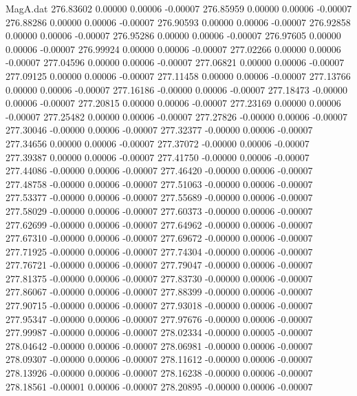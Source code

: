\begin{filecontents}{MagA.dat}
 276.83602    0.00000    0.00006   -0.00007
 276.85959    0.00000    0.00006   -0.00007
 276.88286    0.00000    0.00006   -0.00007
 276.90593    0.00000    0.00006   -0.00007
 276.92858    0.00000    0.00006   -0.00007
 276.95286    0.00000    0.00006   -0.00007
 276.97605    0.00000    0.00006   -0.00007
 276.99924    0.00000    0.00006   -0.00007
 277.02266    0.00000    0.00006   -0.00007
 277.04596    0.00000    0.00006   -0.00007
 277.06821    0.00000    0.00006   -0.00007
 277.09125    0.00000    0.00006   -0.00007
 277.11458    0.00000    0.00006   -0.00007
 277.13766    0.00000    0.00006   -0.00007
 277.16186   -0.00000    0.00006   -0.00007
 277.18473   -0.00000    0.00006   -0.00007
 277.20815    0.00000    0.00006   -0.00007
 277.23169    0.00000    0.00006   -0.00007
 277.25482    0.00000    0.00006   -0.00007
 277.27826   -0.00000    0.00006   -0.00007
 277.30046   -0.00000    0.00006   -0.00007
 277.32377   -0.00000    0.00006   -0.00007
 277.34656    0.00000    0.00006   -0.00007
 277.37072   -0.00000    0.00006   -0.00007
 277.39387    0.00000    0.00006   -0.00007
 277.41750   -0.00000    0.00006   -0.00007
 277.44086   -0.00000    0.00006   -0.00007
 277.46420   -0.00000    0.00006   -0.00007
 277.48758   -0.00000    0.00006   -0.00007
 277.51063   -0.00000    0.00006   -0.00007
 277.53377   -0.00000    0.00006   -0.00007
 277.55689   -0.00000    0.00006   -0.00007
 277.58029   -0.00000    0.00006   -0.00007
 277.60373   -0.00000    0.00006   -0.00007
 277.62699   -0.00000    0.00006   -0.00007
 277.64962   -0.00000    0.00006   -0.00007
 277.67310   -0.00000    0.00006   -0.00007
 277.69672   -0.00000    0.00006   -0.00007
 277.71925   -0.00000    0.00006   -0.00007
 277.74304   -0.00000    0.00006   -0.00007
 277.76721   -0.00000    0.00006   -0.00007
 277.79047   -0.00000    0.00006   -0.00007
 277.81375   -0.00000    0.00006   -0.00007
 277.83730   -0.00000    0.00006   -0.00007
 277.86067   -0.00000    0.00006   -0.00007
 277.88399   -0.00000    0.00006   -0.00007
 277.90715   -0.00000    0.00006   -0.00007
 277.93018   -0.00000    0.00006   -0.00007
 277.95347   -0.00000    0.00006   -0.00007
 277.97676   -0.00000    0.00006   -0.00007
 277.99987   -0.00000    0.00006   -0.00007
 278.02334   -0.00000    0.00005   -0.00007
 278.04642   -0.00000    0.00006   -0.00007
 278.06981   -0.00000    0.00006   -0.00007
 278.09307   -0.00000    0.00006   -0.00007
 278.11612   -0.00000    0.00006   -0.00007
 278.13926   -0.00000    0.00006   -0.00007
 278.16238   -0.00000    0.00006   -0.00007
 278.18561   -0.00001    0.00006   -0.00007
 278.20895   -0.00000    0.00006   -0.00007

\end{filecontents}
